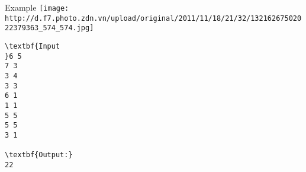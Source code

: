 Example
\texttt{[image: http://d.f7.photo.zdn.vn/upload/original/2011/11/18/21/32/13216267502022379363\_574\_574.jpg]}
\begin{verbatim}
\textbf{Input
}6 5 
7 3 
3 4 
3 3 
6 1 
1 1 
5 5 
5 5 
3 1

\textbf{Output:}
22
\end{verbatim}